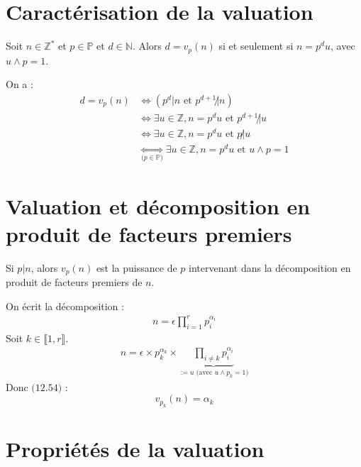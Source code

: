 \documentclass[../main.tex]{subfiles}
\begin{document}
\setcounter{section}{53}
\section{Caractérisation de la valuation}
\begin{tcolorbox}[title=Théorème 12.54, title filled=false, colframe=orange, colback=orange!10!white]
    Soit $n \in \mathbb{Z}^*$ et $p \in \mathbb{P}$ et $d \in \mathbb{N}$. Alors $d = v_p(n)$ si et seulement si $n = p^d u$, avec $u \wedge p = 1$.
\end{tcolorbox}

On a : 
\begin{align*}
    d = v_p(n) &\Leftrightarrow (p^d | n \text{ et } p^{d+1} \not | n) \\
    &\Leftrightarrow \exists u \in \mathbb{Z}, n = p^d u \text{ et } p^{d+1} \not | u \\
    &\Leftrightarrow \exists u \in \mathbb{Z}, n = p^d u \text{ et } p \not | u \\
    &\underset{\text{($p \in \mathbb{P}$)}}{\Leftrightarrow} \exists u \in \mathbb{Z}, n = p^d u \text{ et } u \wedge p = 1
\end{align*}

\section{Valuation et décomposition en produit de facteurs premiers}

\begin{tcolorbox}[title=Théorème 12.55, title filled=false, colframe=orange, colback=orange!10!white]
    Si $p | n$, alors $v_p(n)$ est la puissance de $p$ intervenant dans la décomposition en produit de facteurs premiers de $n$. 
\end{tcolorbox}

On écrit la décomposition : 
\begin{align*}
    n = \epsilon \prod_{i=1}^{r} p_i^{\alpha_i}
\end{align*}
Soit $k \in \llbracket 1, r \rrbracket$. 
\begin{align*}
    n = \epsilon \times p_k^{\alpha_k} \times \underbrace{\prod_{i \neq k} p_i^{\alpha_i}}_{:= u \text{ (avec $u \wedge p_k = 1$)}}
\end{align*}
Donc $\text{(12.54)}$ : 
$$\boxed{v_{p_k}(n) = \alpha_k}$$

\section{Propriétés de la valuation}
\end{document}
